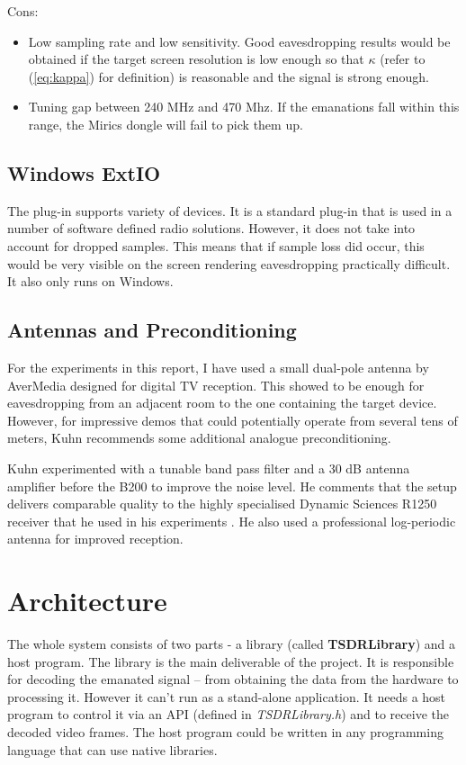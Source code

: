 \documentclass[a4paper,12pt,twoside,openright]{report}
\begin{document}
Cons:
\begin{itemize}
	\item Low sampling rate and low sensitivity. Good eavesdropping results would be obtained if the target screen resolution is low enough so that $\kappa$ (refer to (\ref{eq:kappa}) for definition) is reasonable and the signal is strong enough.
	\item Tuning gap between 240 MHz and 470 Mhz. If the emanations fall within this range, the Mirics dongle will fail to pick them up.
\end{itemize}

\subsection{Windows ExtIO}

The plug-in supports variety of devices. It is a standard plug-in that is used in a number of software defined radio solutions. However, it does not take into account for dropped samples. This means that if sample loss did occur, this would be very visible on the screen rendering eavesdropping practically difficult. It also only runs on Windows.

\subsection{Antennas and Preconditioning}

For the experiments in this report, I have used a small dual-pole antenna by AverMedia designed for digital TV reception. This showed to be enough for eavesdropping from an adjacent room to the one containing the target device. However, for impressive demos that could potentially operate from several tens of meters, Kuhn recommends some additional analogue preconditioning.

Kuhn experimented with a tunable band pass filter and a 30 dB antenna amplifier before the B200 to improve the noise level. He comments that the setup delivers comparable quality to the highly specialised Dynamic Sciences R1250 receiver that he used in his experiments \cite{kuhn2003compromising}. He also used a professional log-periodic antenna for improved reception.

\section{Architecture}

The whole system consists of two parts - a library (called \textbf{TSDRLibrary}) and a host program. The library is the main deliverable of the project. It is responsible for decoding the emanated signal -- from obtaining the data from the hardware to processing it. However it can't run as a stand-alone application. It needs a host program to control it via an API (defined in \textit{TSDRLibrary.h}) and to receive the decoded video frames. The host program could be written in any programming language that can use native libraries.
\end{document}
